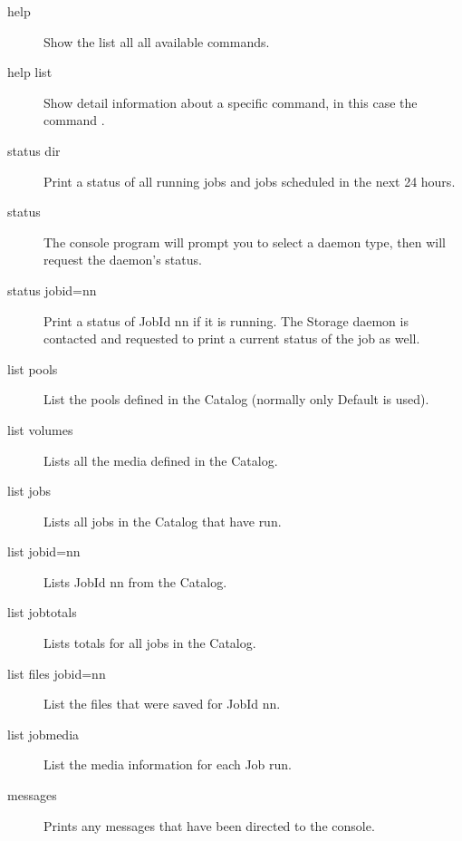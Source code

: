 \begin{description}
\item [help]
    Show the list all all available commands.

\item [help list]
    Show detail information about a specific command, in this case the command .

\item [status dir]
   Print a status of all running jobs and jobs  scheduled in the next 24 hours.

\item [status]
   The console program will prompt you to select  a daemon type, then will
request the daemon's status.

\item [status jobid=nn]
   Print a status of JobId nn if it is running.  The Storage daemon is contacted
and requested to print a current  status of the job as well.

\item [list pools]
   List the pools defined in the Catalog (normally  only Default is used).

\item [list volumes]
   Lists all the media defined in the Catalog.

\item [list jobs]
   Lists all jobs in the Catalog that have run.

\item [list jobid=nn]
   Lists JobId nn from the Catalog.

\item [list jobtotals]
   Lists totals for all jobs in the Catalog.

\item [list files jobid=nn]
   List the files that were saved for JobId nn.

\item [list jobmedia]
   List the media information for each Job run.

\item [messages]
   Prints any messages that have been directed to the console.


\end{description}
